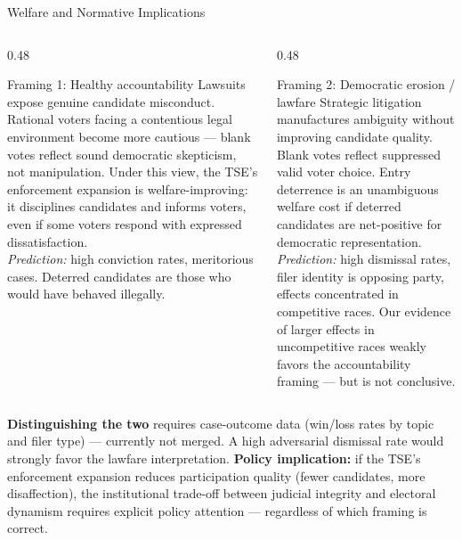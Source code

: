 \documentclass[aspectratio=169,10pt]{beamer}
\begin{document}
\begin{frame}{Welfare and Normative Implications}
\begin{columns}[T]
\begin{column}{0.48\textwidth}
\begin{block}{Framing 1: Healthy accountability}
  Lawsuits expose genuine candidate misconduct. Rational voters facing a contentious legal environment become more cautious --- blank votes reflect sound democratic skepticism, not manipulation. Under this view, the TSE's enforcement expansion is welfare-improving: it disciplines candidates and informs voters, even if some voters respond with expressed dissatisfaction.\\[4pt]
  \textit{Prediction:} high conviction rates, meritorious cases. Deterred candidates are those who would have behaved illegally.
\end{block}
\end{column}
\begin{column}{0.48\textwidth}
\begin{alertblock}{Framing 2: Democratic erosion / lawfare}
  Strategic litigation manufactures ambiguity without improving candidate quality. Blank votes reflect suppressed valid voter choice. Entry deterrence is an unambiguous welfare cost if deterred candidates are net-positive for democratic representation.\\[4pt]
  \textit{Prediction:} high dismissal rates, filer identity is opposing party, effects concentrated in competitive races. Our evidence of larger effects in uncompetitive races weakly favors the accountability framing --- but is not conclusive.
\end{alertblock}
\end{column}
\end{columns}
\bigskip
\textbf{Distinguishing the two} requires case-outcome data (win/loss rates by topic and filer type) --- currently not merged. A high adversarial dismissal rate would strongly favor the lawfare interpretation. \textbf{Policy implication:} if the TSE's enforcement expansion reduces participation quality (fewer candidates, more disaffection), the institutional trade-off between judicial integrity and electoral dynamism requires explicit policy attention --- regardless of which framing is correct.
\end{frame}
\end{document}

